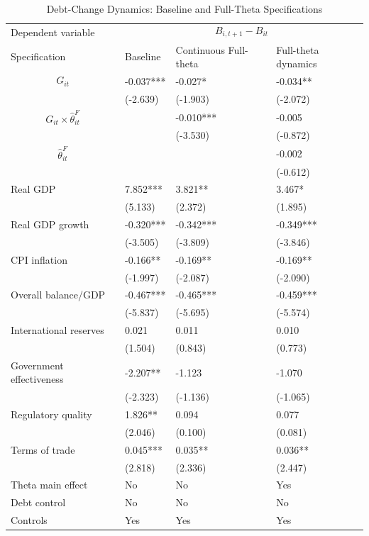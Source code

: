 \begin{table}[H]\centering
\begin{threeparttable}
\caption{Debt-Change Dynamics: Baseline and Full-Theta Specifications}
\label{tab:debt_change_combined_fulltheta}
\scriptsize
\begin{tabularx}{\textwidth}{lYYY}
\toprule
Dependent variable &  \\
\cmidrule(lr){2-4}
Specification & Baseline & Continuous Full-theta & Full-theta dynamics \\
\midrule
$$G_{it}$$ & -0.037*** & -0.027* & -0.034** \\
 & (-2.639) & (-1.903) & (-2.072) \\
$$G_{it}\times\widehat{\theta}^{F}_{it}$$ &  & -0.010*** & -0.005 \\
 &  & (-3.530) & (-0.872) \\
$$\widehat{\theta}^{F}_{it}$$ &  &  & -0.002 \\
 &  &  & (-0.612) \\
Real GDP & 7.852*** & 3.821** & 3.467* \\
 & (5.133) & (2.372) & (1.895) \\
Real GDP growth & -0.320*** & -0.342*** & -0.349*** \\
 & (-3.505) & (-3.809) & (-3.846) \\
CPI inflation & -0.166** & -0.169** & -0.169** \\
 & (-1.997) & (-2.087) & (-2.090) \\
Overall balance/GDP & -0.467*** & -0.465*** & -0.459*** \\
 & (-5.837) & (-5.695) & (-5.574) \\
International reserves & 0.021 & 0.011 & 0.010 \\
 & (1.504) & (0.843) & (0.773) \\
Government effectiveness & -2.207** & -1.123 & -1.070 \\
 & (-2.323) & (-1.136) & (-1.065) \\
Regulatory quality & 1.826** & 0.094 & 0.077 \\
 & (2.046) & (0.100) & (0.081) \\
Terms of trade & 0.045*** & 0.035** & 0.036** \\
 & (2.818) & (2.336) & (2.447) \\
\midrule
Theta main effect & No & No & Yes \\
Debt control & No & No & No \\
Controls & Yes & Yes & Yes \\

\end{tabularx}
\end{threeparttable}
\end{table}
